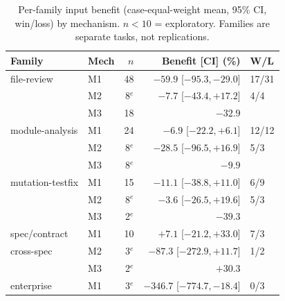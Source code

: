 \documentclass[twocolumn]{svjour3}       %
\begin{document}
\begin{table}[t]
\centering\scriptsize
\caption{Per-family input benefit (case-equal-weight mean, 95\% CI, win/loss) by
mechanism. $n<10$ = exploratory. Families are separate tasks, not replications.}
\label{tab:family}
\setlength{\tabcolsep}{3.2pt}
\begin{tabular}{@{}llrrl@{}}
\toprule
Family & Mech & $n$ & Benefit [CI] (\%) & W/L \\
\midrule
file-review & M1 & 48 & \textcolor[rgb]{0.55,0.09,0.18}{$-59.9$} [$-95.3,-29.0$] & 17/31 \\
            & M2 & 8$^{e}$ & \textcolor[rgb]{0.55,0.09,0.18}{$-7.7$} [$-43.4,+17.2$] & 4/4 \\
            & M3 & 18 & \textcolor[rgb]{0.55,0.09,0.18}{$-32.9$} &  \\
module-analysis & M1 & 24 & \textcolor[rgb]{0.55,0.09,0.18}{$-6.9$} [$-22.2,+6.1$] & 12/12 \\
            & M2 & 8$^{e}$ & \textcolor[rgb]{0.55,0.09,0.18}{$-28.5$} [$-96.5,+16.9$] & 5/3 \\
            & M3 & 8$^{e}$ & \textcolor[rgb]{0.55,0.09,0.18}{$-9.9$} &  \\
mutation-testfix & M1 & 15 & \textcolor[rgb]{0.55,0.09,0.18}{$-11.1$} [$-38.8,+11.0$] & 6/9 \\
            & M2 & 8$^{e}$ & \textcolor[rgb]{0.55,0.09,0.18}{$-3.6$} [$-26.5,+19.6$] & 5/3 \\
            & M3 & 2$^{e}$ & \textcolor[rgb]{0.55,0.09,0.18}{$-39.3$} &  \\
spec/contract & M1 & 10 & \textcolor[rgb]{0.10,0.42,0.22}{$+7.1$} [$-21.2,+33.0$] & 7/3 \\
cross-spec & M2 & 3$^{e}$ & \textcolor[rgb]{0.55,0.09,0.18}{$-87.3$} [$-272.9,+11.7$] & 1/2 \\
           & M3 & 2$^{e}$ & \textcolor[rgb]{0.10,0.42,0.22}{$+30.3$} &  \\
enterprise & M1 & 3$^{e}$ & \textcolor[rgb]{0.55,0.09,0.18}{$-346.7$} [$-774.7,-18.4$] & 0/3 \\
\bottomrule
\end{tabular}
\end{table}
\end{document}
